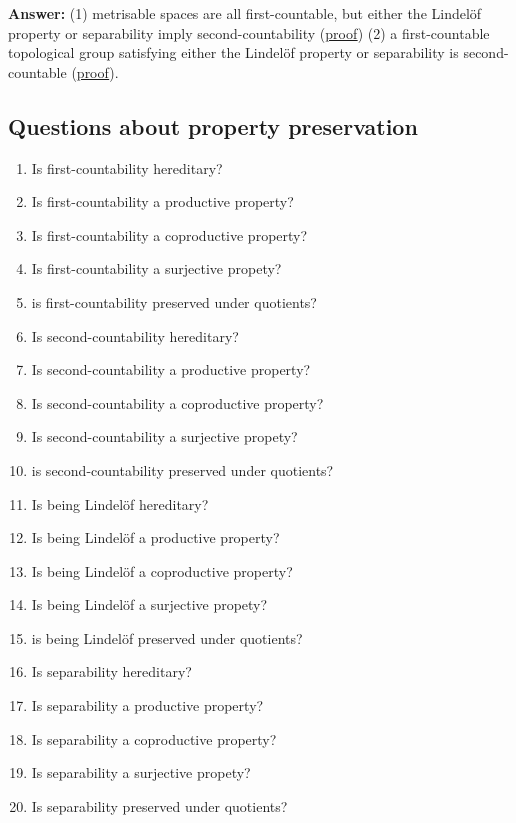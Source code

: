 \begin{enumerate}
        \textbf{Answer:} (1) metrisable spaces are all first-countable, but either the Lindel\"of property or separability imply second-countability (\hyperlink{MetrisableSpaceCountabilityProperties}{proof}) (2) a first-countable topological group satisfying either the Lindel\"of property or separability is second-countable (\hyperlink{MunkresP30.18}{proof}).
\end{enumerate}

\subsection{Questions about property preservation}
\begin{enumerate}
    \item Is first-countability hereditary?
    \item Is first-countability a productive property?
    \item Is first-countability a coproductive property?
    \item Is first-countability a surjective propety?
    \item is first-countability preserved under quotients?
    \item Is second-countability hereditary?
    \item Is second-countability a productive property?
    \item Is second-countability a coproductive property?
    \item Is second-countability a surjective propety?
    \item is second-countability preserved under quotients?
    \item Is being Lindel\"of hereditary?
    \item Is being Lindel\"of a productive property?
    \item Is being Lindel\"of a coproductive property?
    \item Is being Lindel\"of a surjective propety?
    \item is being Lindel\"of preserved under quotients?
    \item Is separability hereditary?
    \item Is separability a productive property?
    \item Is separability a coproductive property?
    \item Is separability a surjective propety?
    \item Is separability preserved under quotients?
\end{enumerate}
